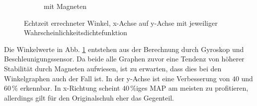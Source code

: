 \begin{figure}[tb]
\begin{adjustwidth}{-0.2\linewidth}{-0.2\linewidth}
\begin{subfigure}[c]{.45\linewidth}
			\caption{mit Magneten}
			\vspace{5pt}
		\end{subfigure}
	\end{adjustwidth}
	\caption{Echtzeit errechneter Winkel, x-Achse auf y-Achse mit jeweiliger Wahrscheinlichkeitsdichtefunktion} \label{Angle}
\end{figure}
Die Winkelwerte in Abb. \ref{Angle} entstehen aus der Berechnung durch Gyroskop und Beschleunigungssensor. Da beide alle Graphen zuvor eine Tendenz von höherer Stabilität durch Magneten aufwiesen, ist zu erwarten, dass dies bei den Winkelgraphen auch der Fall ist. In der y-Achse ist eine Verbesserung von $40$ und $60\,\%$ erkennbar. In x-Richtung scheint $40\,\%$iges MAP am meisten zu profitieren, allerdings gilt für den Originalschuh eher das Gegenteil. 


